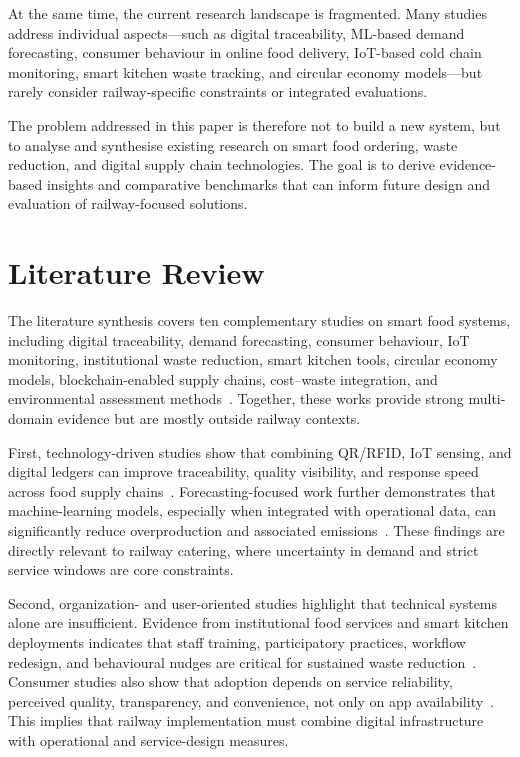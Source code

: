 \documentclass[conference]{IEEEtran}
\begin{document}
At the same time, the current research landscape is fragmented. Many studies address individual aspects—such as digital traceability, ML-based demand forecasting, consumer behaviour in online food delivery, IoT-based cold chain monitoring, smart kitchen waste tracking, and circular economy models—but rarely consider railway-specific constraints or integrated evaluations.

The problem addressed in this paper is therefore not to build a new system, but to analyse and synthesise existing research on smart food ordering, waste reduction, and digital supply chain technologies. The goal is to derive evidence-based insights and comparative benchmarks that can inform future design and evaluation of railway-focused solutions.

\section{Literature Review}

The literature synthesis covers ten complementary studies on smart food systems, including digital traceability, demand forecasting, consumer behaviour, IoT monitoring, institutional waste reduction, smart kitchen tools, circular economy models, blockchain-enabled supply chains, cost--waste integration, and environmental assessment methods~\cite{tarhan2025,mattila2025,varsini2025,wjarr2025cold,ijam2025,benchmark2023,ce4re2025,wjarr2024blockchain,pathway10,envmgmt2025}. Together, these works provide strong multi-domain evidence but are mostly outside railway contexts.

First, technology-driven studies show that combining QR/RFID, IoT sensing, and digital ledgers can improve traceability, quality visibility, and response speed across food supply chains~\cite{tarhan2025,wjarr2025cold,wjarr2024blockchain}. Forecasting-focused work further demonstrates that machine-learning models, especially when integrated with operational data, can significantly reduce overproduction and associated emissions~\cite{mattila2025}. These findings are directly relevant to railway catering, where uncertainty in demand and strict service windows are core constraints.

Second, organization- and user-oriented studies highlight that technical systems alone are insufficient. Evidence from institutional food services and smart kitchen deployments indicates that staff training, participatory practices, workflow redesign, and behavioural nudges are critical for sustained waste reduction~\cite{ijam2025,benchmark2023}. Consumer studies also show that adoption depends on service reliability, perceived quality, transparency, and convenience, not only on app availability~\cite{varsini2025}. This implies that railway implementation must combine digital infrastructure with operational and service-design measures.
\end{document}
